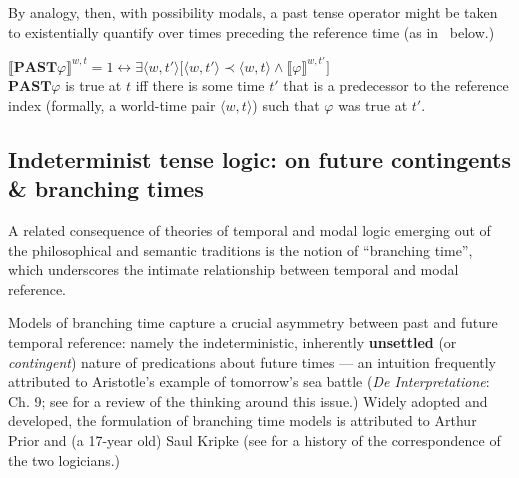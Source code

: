 \documentclass[12pt,dvipsnames]{report}
\providecommand{\denote}[2][]{\ensuremath{\llbracket{#2}\rrbracket^{#1}}}
\begin{document}
By analogy, then, with possibility modals, a past tense operator might be taken to existentially quantify over times preceding the reference time (as in \nextx~below.)

\pex $ \denote[w,t]{\mathbf{PAST}\varphi}=1\leftrightarrow\exists \langle{w,t'}\rangle\big[\langle{w,t'}\rangle\prec \langle{w,t}\rangle\wedge \denote[w,t']{\varphi}\big]$\\
$ \mathbf{PAST}\varphi $ is true at $ t $ iff there is some time $ t' $ that is a predecessor to the reference index (formally, a world-time pair $ \langle w,t\rangle $) such that $ \varphi $ was true at $ t' $.\xe


\subsection{Indeterminist tense logic: on future contingents \& branching times}\label{BT-review} A related consequence of theories of temporal and modal logic emerging out of the philosophical and semantic traditions is the notion of ``branching time'', which underscores the intimate relationship between temporal and modal reference.  %


Models of branching time capture a crucial asymmetry between past and future temporal reference: namely the indeterministic, inherently \textbf{unsettled} (or \textit{contingent}) nature of predications about future times --- an intuition frequently attributed to Aristotle's example of tomorrow's sea battle (\textit{De Interpretatione}: Ch. 9; see \citealt{Øhrstrøm1995} for a review of the thinking around this issue.) Widely adopted and developed, the formulation of branching time models is attributed to Arthur Prior and (a 17-year old) Saul Kripke (see \citet{Ploug2012} for a history of the correspondence of the two logicians.)
\end{document}
